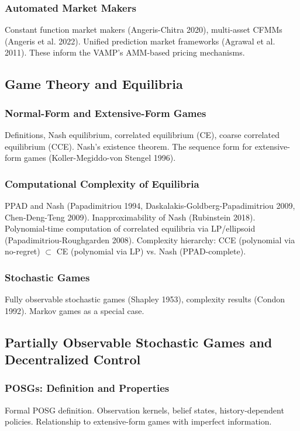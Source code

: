 \subsubsection{Automated Market Makers}
Constant function market makers (Angeris-Chitra 2020), multi-asset CFMMs (Angeris et al. 2022). Unified prediction market frameworks (Agrawal et al. 2011). These inform the VAMP's AMM-based pricing mechanisms.

\subsection{Game Theory and Equilibria}
\subsubsection{Normal-Form and Extensive-Form Games}
Definitions, Nash equilibrium, correlated equilibrium (CE), coarse correlated equilibrium (CCE). Nash's existence theorem. The sequence form for extensive-form games (Koller-Megiddo-von Stengel 1996).

\subsubsection{Computational Complexity of Equilibria}
PPAD and Nash (Papadimitriou 1994, Daskalakis-Goldberg-Papadimitriou 2009, Chen-Deng-Teng 2009). Inapproximability of Nash (Rubinstein 2018). Polynomial-time computation of correlated equilibria via LP/ellipsoid (Papadimitriou-Roughgarden 2008). Complexity hierarchy: CCE (polynomial via no-regret) $\subset$ CE (polynomial via LP) vs. Nash (PPAD-complete).

\subsubsection{Stochastic Games}
Fully observable stochastic games (Shapley 1953), complexity results (Condon 1992). Markov games as a special case.

\subsection{Partially Observable Stochastic Games and Decentralized Control}
\subsubsection{POSGs: Definition and Properties}
Formal POSG definition. Observation kernels, belief states, history-dependent policies. Relationship to extensive-form games with imperfect information.

